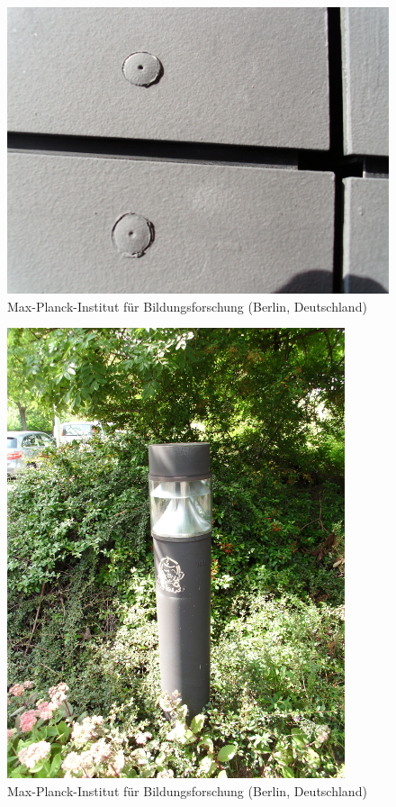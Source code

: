 \documentclass[a4paper,
fontsize=11pt,
oneside,
numbers=noperiodatend,
parskip=half-,
bibliography=totoc,
final
]{scrartcl}
\begin{document}
\begin{figure}[htbp]
\centering
\includegraphics{./img/052.jpg}
\caption{Max-Planck-Institut für Bildungsforschung (Berlin,
Deutschland)}
\end{figure}

\begin{figure}[htbp]
\centering
\includegraphics{./img/053.jpg}
\caption{Max-Planck-Institut für Bildungsforschung (Berlin,
Deutschland)}
\end{figure}
\end{document}
